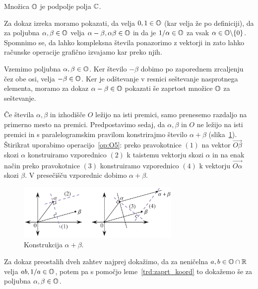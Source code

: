 \begin{izrek}
    \label{izr:podpolje}
    Množica $\mathbb O$ je podpolje polja $\mathbb C$.
\end{izrek}

\begin{dokaz}
    Za dokaz izreka moramo pokazati, da velja $0, 1 \in \mathbb O$ (kar velja že po definiciji), da za poljubna $\alpha, \beta \in \mathbb O$ velja $\alpha - \beta, \alpha\beta \in \mathbb O$ in da je $1/\alpha \in \mathbb O$ za vsak $\alpha \in \mathbb O \backslash \{0\}$. Spomnimo se, da lahko kompleksna števila ponazorimo z vektorji in zato lahko računske operacije grafično izvajamo kar preko njih.

    Vzemimo poljubna $\alpha, \beta \in \mathbb O$. Ker število $-\beta$ dobimo po zaporednem zrcaljenju čez obe osi, velja $-\beta \in \mathbb O$. Ker je odštevanje v resnici seštevanje nasprotnega elementa, moramo za dokaz $\alpha - \beta \in \mathbb O$ pokazati še zaprtost množice $\mathbb O$ za seštevanje.

    Če števila $\alpha, \beta$ in izhodišče $O$ ležijo na isti premici, samo prenesemo razdaljo na primerno mesto na premici. Predpostavimo sedaj, da $\alpha, \beta$ in $O$ ne ležijo na isti premici in s paralelogramskim pravilom konstrirajmo število $\alpha + \beta$ (slika~\ref{fig:sestevanje}). Štirikrat uporabimo operacijo~\ref{op:O5}: preko pravokotnice $(1)$ na vektor $\overrightarrow{O\beta}$ skozi $\alpha$ konstruiramo vzporednico $(2)$ k taistemu vektorju skozi $\alpha$ in na enak način preko pravokotnice $(3)$ konstruiramo vzporednico $(4)$ k vektorju $\overrightarrow{O\alpha}$ skozi $\beta$. V presečišču vzporednic dobimo $\alpha + \beta$.

    \begin{figure}[h]
        \centering
        \includegraphics[width=0.7\textwidth]{images/algebra/sestevanje.png}
        \caption[Seštevanje origami števil]{Konstrukcija $\alpha + \beta$.}
        \label{fig:sestevanje}
    \end{figure}

    Za dokaz preostalih dveh zahtev najprej dokažimo, da za neničelna $a, b \in \mathbb O \cap \mathbb R$ velja $ab, 1/a \in \mathbb O$, potem pa s pomočjo leme~\ref{trd:zaprt_koord} to dokažemo še za poljubna $\alpha, \beta \in \mathbb O$.


\end{dokaz}

